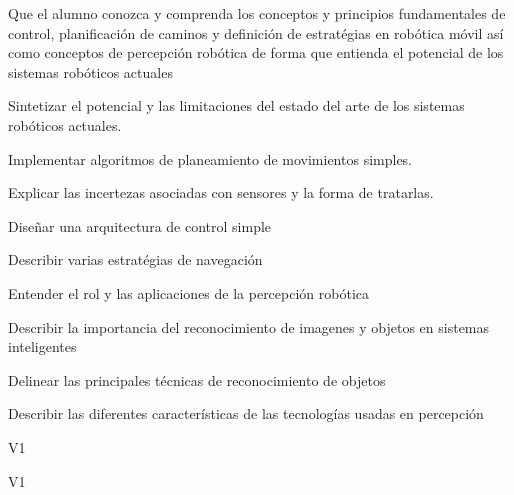 \begin{syllabus}


\begin{justification}
Que el alumno conozca y comprenda los conceptos y principios fundamentales de control, planificación de caminos y
definición de estratégias en robótica móvil así como conceptos de percepción robótica de forma que entienda el potencial
de los sistemas robóticos actuales
\end{justification}

\begin{goals}
\item Sintetizar el potencial y las limitaciones del estado del arte de los sistemas robóticos actuales.
\item Implementar algoritmos de planeamiento de movimientos simples.
\item Explicar las incertezas asociadas con sensores y la forma de tratarlas.
\item Diseñar una arquitectura de control simple
\item Describir varias estratégias de navegación
\item Entender el rol y las aplicaciones de la percepción robótica
\item Describir la importancia del reconocimiento de imagenes y objetos en sistemas inteligentes
\item Delinear las principales técnicas de reconocimiento de objetos
\item Describir las diferentes características de las tecnologías usadas en percepción
\end{goals}

\begin{outcomes}{V1}
    \item {}
    \item {}
    \item {}
    \item {}
\end{outcomes}

\begin{competences}{V1}
    \item {} 
    \item {} 
    \item {}
    \item {}
\end{competences}


\end{syllabus}
